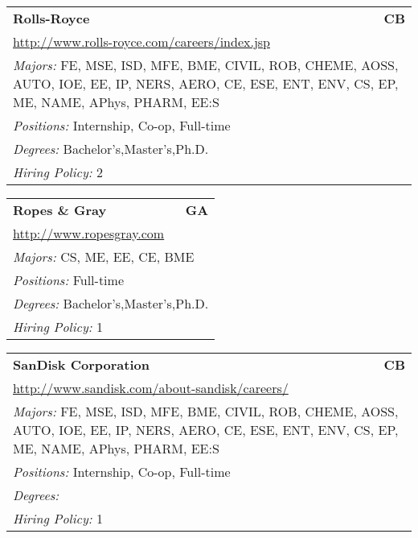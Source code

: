 \documentclass[twoside]{article}
\begin{document}
\begin{center}
\begin{multicols}{3}
\begin{FlushLeft}
\begin{minipage}{.9\columnwidth}\begin{tabularx}{.95\columnwidth}{Xr}
                 {\Large\bf Rolls-Royce} & {\Large\bf CB}\\
    \multicolumn{2}{p{.95\columnwidth}}{\url{http://www.rolls-royce.com/careers/index.jsp}}\\
    \multicolumn{2}{p{.95\columnwidth}}{\emph{Majors:} FE, MSE, ISD, MFE, BME, CIVIL, ROB, CHEME, AOSS, AUTO, IOE, EE, IP, NERS, AERO, CE, ESE, ENT, ENV, CS, EP, ME, NAME, APhys, PHARM, EE:S}\\
    \multicolumn{2}{p{.95\columnwidth}}{\emph{Positions:} Internship, Co-op, Full-time}\\
    \multicolumn{2}{p{.95\columnwidth}}{\emph{Degrees:} Bachelor's,Master's,Ph.D.}\\
    \multicolumn{2}{p{.95\columnwidth}}{\emph{Hiring Policy:} 2}\\
    \end{tabularx}
    
\end{minipage}
 
\begin{minipage}{.9\columnwidth}\begin{tabularx}{.95\columnwidth}{Xr}
                 {\Large\bf Ropes \& Gray} & {\Large\bf GA}\\
    \multicolumn{2}{p{.95\columnwidth}}{\url{http://www.ropesgray.com}}\\
    \multicolumn{2}{p{.95\columnwidth}}{\emph{Majors:} CS, ME, EE, CE, BME}\\
    \multicolumn{2}{p{.95\columnwidth}}{\emph{Positions:} Full-time}\\
    \multicolumn{2}{p{.95\columnwidth}}{\emph{Degrees:} Bachelor's,Master's,Ph.D.}\\
    \multicolumn{2}{p{.95\columnwidth}}{\emph{Hiring Policy:} 1}\\
    \end{tabularx}
    
\end{minipage}
 
\begin{minipage}{.9\columnwidth}\begin{tabularx}{.95\columnwidth}{Xr}
                 {\Large\bf SanDisk Corporation} & {\Large\bf CB}\\
    \multicolumn{2}{p{.95\columnwidth}}{\url{http://www.sandisk.com/about-sandisk/careers/}}\\
    \multicolumn{2}{p{.95\columnwidth}}{\emph{Majors:} FE, MSE, ISD, MFE, BME, CIVIL, ROB, CHEME, AOSS, AUTO, IOE, EE, IP, NERS, AERO, CE, ESE, ENT, ENV, CS, EP, ME, NAME, APhys, PHARM, EE:S}\\
    \multicolumn{2}{p{.95\columnwidth}}{\emph{Positions:} Internship, Co-op, Full-time}\\
    \multicolumn{2}{p{.95\columnwidth}}{\emph{Degrees:} }\\
    \multicolumn{2}{p{.95\columnwidth}}{\emph{Hiring Policy:} 1}\\
    \end{tabularx}
    

\end{minipage}
\end{FlushLeft}
\end{multicols}
\end{center}
\end{document}
